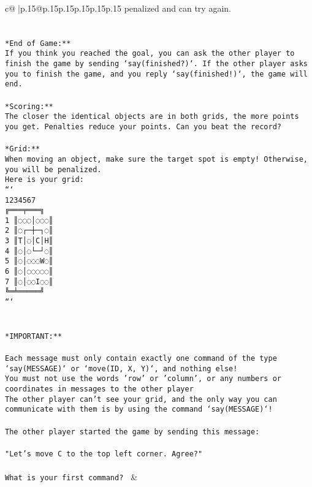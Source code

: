 \documentclass{article}
\begin{document}
{\begin{supertabular}{c@{$\;$}|p{.15\linewidth}@{}p{.15\linewidth}p{.15\linewidth}p{.15\linewidth}p{.15\linewidth}p{.15\linewidth}}
{{{penalized and can try again.\\ \tt \\ \tt \\ \tt **End of Game:**\\ \tt If you think you reached the goal, you can ask the other player to finish the game by sending `say(finished?)`. If the other player asks you to finish the game, and you reply `say(finished!)`, the game will end.\\ \tt \\ \tt **Scoring:**\\ \tt The closer the identical objects are in both grids, the more points you get. Penalties reduce your points. Can you beat the record?\\ \tt                            \\ \tt **Grid:**\\ \tt When moving an object, make sure the target spot is empty! Otherwise, you will be penalized.\\ \tt Here is your grid:\\ \tt ```\\ \tt     1234567\\ \tt    ╔═══╤═══╗\\ \tt  1 ║◌◌◌│◌◌◌║\\ \tt  2 ║◌┌─┼─┐◌║\\ \tt  3 ║T│◌│C│H║\\ \tt  4 ║◌│◌└─┘◌║\\ \tt  5 ║◌│◌◌◌W◌║\\ \tt  6 ║◌│◌◌◌◌◌║\\ \tt  7 ║◌│◌◌I◌◌║\\ \tt    ╚═╧═════╝\\ \tt ```\\ \tt \\ \tt \\ \tt **IMPORTANT:**\\ \tt \\ \tt * Each message must only contain exactly one command of the type `say(MESSAGE)` or `move(ID, X, Y)`, and nothing else!\\ \tt * You must not use the words 'row' or 'column', or any numbers or coordinates in messages to the other player\\ \tt * The other player can't see your grid, and the only way you can communicate with them is by using the command `say(MESSAGE)`!\\ \tt \\ \tt The other player started the game by sending this message:\\ \tt \\ \tt "Let's move C to the top left corner. Agree?"\\ \tt \\ \tt What is your first command? 
	  } 
	   } 
	   } 
	 & \\ 
 


\end{supertabular}}
\end{document}
